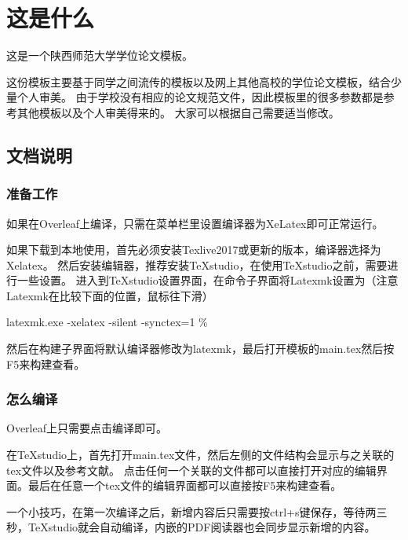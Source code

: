 \chapter[这是什么]{这是什么}  %

这是一个陕西师范大学学位论文模板。

这份模板主要基于同学之间流传的模板以及网上其他高校的学位论文模板，结合少量个人审美。
由于学校没有相应的论文规范文件，因此模板里的很多参数都是参考其他模板以及个人审美得来的。
大家可以根据自己需要适当修改。

\section{文档说明}

\subsection{准备工作}

如果在Overleaf上编译，只需在菜单栏里设置编译器为XeLatex即可正常运行。

如果下载到本地使用，首先必须安装Texlive2017或更新的版本，编译器选择为Xelatex。
然后安装编辑器，推荐安装TeXstudio，在使用TeXstudio之前，需要进行一些设置。
进入到TeXstudio设置界面，在命令子界面将Latexmk设置为（注意Latexmk在比较下面的位置，鼠标往下滑）

{\centering latexmk.exe -xelatex -silent -synctex=1 \% \par}
然后在构建子界面将默认编译器修改为latexmk，最后打开模板的main.tex然后按F5来构建查看。

\subsection{怎么编译}

Overleaf上只需要点击编译即可。

在TeXstudio上，首先打开main.tex文件，然后左侧的文件结构会显示与之关联的tex文件以及参考文献。
点击任何一个关联的文件都可以直接打开对应的编辑界面。最后在任意一个tex文件的编辑界面都可以直接按F5来构建查看。

一个小技巧，在第一次编译之后，新增内容后只需要按ctrl+s键保存，等待两三秒，TeXstudio就会自动编译，内嵌的PDF阅读器也会同步显示新增的内容。

